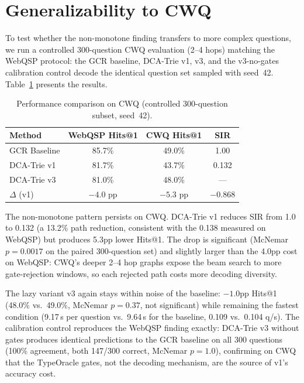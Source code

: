 \section{Generalizability to CWQ}
\label{sec:ch4generalizability}

To test whether the non-monotone finding transfers to more complex questions, we run a controlled 300-question CWQ evaluation (2--4 hops) matching the WebQSP protocol: the GCR baseline, DCA-Trie v1, v3, and the v3-no-gates calibration control decode the identical question set sampled with seed~42. Table~\ref{tab:cwq_results} presents the results.

\begin{table}[H]
  \centering
  \caption[Results on CWQ]{Performance comparison on CWQ (controlled 300-question subset, seed~42).}
  \label{tab:cwq_results}
  \begin{tabularx}{\textwidth}{|X|c|c|c|}
    \hline
    \textbf{Method} & \textbf{WebQSP Hits@1} & \textbf{CWQ Hits@1} & \textbf{SIR} \\
    \hline
    GCR Baseline    & 85.7\%                 & 49.0\%              & 1.00         \\
    \hline
    DCA-Trie v1     & 81.7\%                 & 43.7\%              & 0.132        \\
    \hline
    DCA-Trie v3     & 81.0\%                 & 48.0\%              & ---          \\
    \hline
    $\Delta$ (v1)   & $-4.0$ pp              & $-5.3$ pp           & $-0.868$     \\
    \hline
  \end{tabularx}
\end{table}

The non-monotone pattern persists on CWQ. DCA-Trie v1 reduces SIR from 1.0 to 0.132 (a 13.2\% path reduction, consistent with the 0.138 measured on WebQSP) but produces 5.3pp lower Hits@1. The drop is significant (McNemar $p=0.0017$ on the paired 300-question set) and slightly larger than the 4.0pp cost on WebQSP: CWQ's deeper 2--4 hop graphs expose the beam search to more gate-rejection windows, so each rejected path costs more decoding diversity.

The lazy variant v3 again stays within noise of the baseline: $-1.0$pp Hits@1 (48.0\% vs.\ 49.0\%, McNemar $p=0.37$, not significant) while remaining the fastest condition (9.17\,s per question vs.\ 9.64\,s for the baseline, 0.109 vs.\ 0.104 q/s). The calibration control reproduces the WebQSP finding exactly: DCA-Trie v3 without gates produces identical predictions to the GCR baseline on all 300 questions (100\% agreement, both 147/300 correct, McNemar $p=1.0$), confirming on CWQ that the TypeOracle gates, not the decoding mechanism, are the source of v1's accuracy cost.

